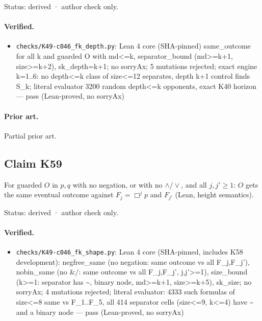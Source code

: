 \documentclass{article}
\begin{document}
Status: derived · author check only.

\paragraph{Verified.}
\begin{itemize}
\item \texttt{checks/K49-c046\_fk\_depth.py}: Lean 4 core (SHA-pinned) same\_outcome for all k and guarded O with md\textless{}=k, separator\_bound (md\textgreater{}=k+1, size\textgreater{}=k+2), sk\_depth=k+1; no sorryAx; 5 mutations rejected; exact engine k=1..6: no depth\textless{}=k class of size\textless{}=12 separates, depth k+1 control finds S\_k; literal evaluator 3200 random depth\textless{}=k opponents, exact K40 horizon --- pass (Lean-proved, no sorryAx)
\end{itemize}

\paragraph{Prior art.} Partial prior art.

\subsection*{Claim K59}

For guarded $O$ in $p,q$ with no negation, or with no $\land/\lor$, and all $j,j'\ge1$: $O$ gets the same eventual outcome against $F_j=\Box^jp$ and $F_{j'}$ (Lean, height semantics).

Status: derived · author check only.

\paragraph{Verified.}
\begin{itemize}
\item \texttt{checks/K49-c046\_fk\_shape.py}: Lean 4 core (SHA-pinned, includes K58 development): negfree\_same (no negation: same outcome vs all F\_j,F\_j'), nobin\_same (no \&/\textbar{}: same outcome vs all F\_j,F\_j', j,j'\textgreater{}=1), size\_bound (k\textgreater{}=1: separator has \textasciitilde{}, binary node, md\textgreater{}=k+1, size\textgreater{}=k+5), sk\_size; no sorryAx; 4 mutations rejected; literal evaluator: 4333 such formulas of size\textless{}=8 same vs F\_1..F\_5, all 414 separator cells (size\textless{}=9, k\textless{}=4) have \textasciitilde{} and a binary node --- pass (Lean-proved, no sorryAx)
\end{itemize}
\end{document}
